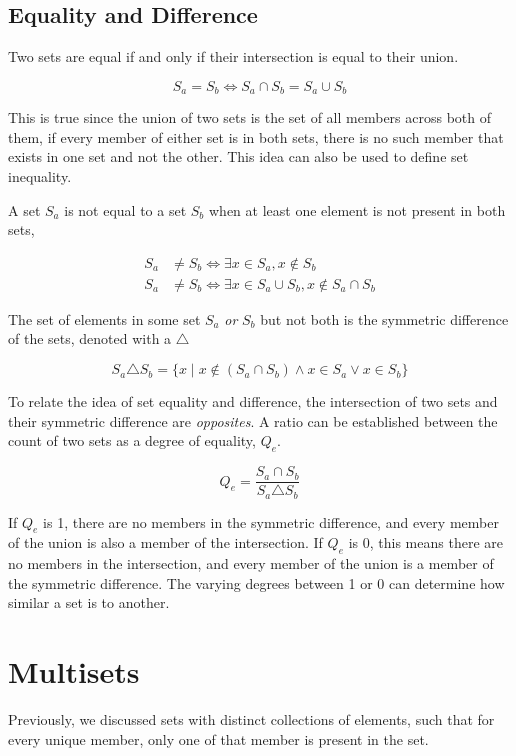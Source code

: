 \subsection{Equality and Difference}

Two sets are equal if and only if their intersection is equal to their union.

$$
S_a = S_b \iff S_a \cap S_b = S_a \cup S_b
$$

This is true since the union of two sets is the set of all members across both of them, if every member of either set is in both sets, there is no such member that exists in one set and not the other. This idea can also be used to define set inequality. 

A set $S_a$ is not equal to a set $S_b$ when at least one element is not present in both sets,

\begin{align}
S_a &\neq S_b \iff \exists x \in S_a, x \notin S_b \\
S_a &\neq S_b \iff \exists x \in S_a \cup S_b, x \notin S_a \cap S_b
\end{align}

The set of elements in some set $S_a$ \textit{or} $S_b$ but not both is the symmetric difference of the sets, denoted with a $\triangle$

$$
S_a \triangle S_b = \{ x \mid x \notin (S_a \cap S_b) \land x \in S_a \lor x \in S_b  \}
$$

To relate the idea of set equality and difference, the intersection of two sets and their symmetric difference are \textit{opposites}. A ratio can be established between the count of two sets as a degree of equality, $Q_e$.

$$
Q_e = \frac{S_a \cap S_b}{S_a \triangle S_b}
$$ 

If $Q_e$ is 1, there are no members in the symmetric difference, and every member of the union is also a member of the intersection. If $Q_e$ is 0, this means there are no members in the intersection, and every member of the union is a member of the symmetric difference. The varying degrees between 1 or 0 can determine how similar a set is to another.

\section{Multisets}

Previously, we discussed sets with distinct collections of elements, such that for every unique member, only one of that member is present in the set.
